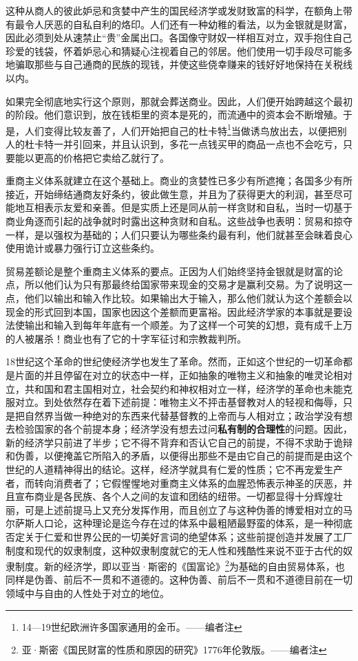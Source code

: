 \documentclass[a4paper,twoside,12pt]{ctexart}
\begin{document}
这种从商人的彼此妒忌和贪婪中产生的国民经济学或发财致富的科学，在额角上带有最令人厌恶的自私自利的烙印。人们还有一种幼稚的看法，以为金银就是财富，因此必须到处从速禁止“贵”金属出口。各国像守财奴一样相互对立，双手抱住自己珍爱的钱袋，怀着妒忌心和猜疑心注视着自己的邻居。他们使用一切手段尽可能多地骗取那些与自己通商的民族的现钱，并使这些侥幸赚来的钱好好地保持在关税线以内。

如果完全彻底地实行这个原则，那就会葬送商业。因此，人们便开始跨越这个最初的阶段。他们意识到，放在钱柜里的资本是死的，而流通中的资本会不断增殖。于是，人们变得比较友善了，人们开始把自己的杜卡特\footnote{14—19世纪欧洲许多国家通用的金币。——编者注 }当做诱鸟放出去，以便把别人的杜卡特一并引回来，并且认识到，多花一点钱买甲的商品一点也不会吃亏，只要能以更高的价格把它卖给乙就行了。

重商主义体系就建立在这个基础上。商业的贪婪性已多少有所遮掩；各国多少有所接近，开始缔结通商友好条约，彼此做生意，并且为了获得更大的利润，甚至尽可能地互相表示友爱和亲善。但是实质上还是同从前一样贪财和自私，当时一切基于商业角逐而引起的战争就时时露出这种贪财和自私。这些战争也表明：贸易和掠夺一样，是以强权为基础的；人们只要认为哪些条约最有利，他们就甚至会昧着良心使用诡计或暴力强行订立这些条约。

贸易差额论是整个重商主义体系的要点。正因为人们始终坚持金银就是财富的论点，所以他们认为只有那最终给国家带来现金的交易才是赢利交易。为了说明这一点，他们以输出和输入作比较。如果输出大于输入，那么他们就认为这个差额会以现金的形式回到本国，国家也因这个差额而更富裕。因此经济学家的本事就是要设法使输出和输入到每年年底有一个顺差。为了这样一个可笑的幻想，竟有成千上万的人被屠杀！商业也有了它的十字军征讨和宗教裁判所。

18世纪这个革命的世纪使经济学也发生了革命。然而，正如这个世纪的一切革命都是片面的并且停留在对立的状态中一样，正如抽象的唯物主义和抽象的唯灵论相对立，共和国和君主国相对立，社会契约和神权相对立一样，经济学的革命也未能克服对立。到处依然存在着下述前提：唯物主义不抨击基督教对人的轻视和侮辱，只是把自然界当做一种绝对的东西来代替基督教的上帝而与人相对立；政治学没有想去检验国家的各个前提本身；经济学没有想去过问\textbf{私有制的合理性}的问题。因此，新的经济学只前进了半步；它不得不背弃和否认它自己的前提，不得不求助于诡辩和伪善，以便掩盖它所陷入的矛盾，以便得出那些不是由它自己的前提而是由这个世纪的人道精神得出的结论。这样，经济学就具有仁爱的性质；它不再宠爱生产者，而转向消费者了；它假惺惺地对重商主义体系的血腥恐怖表示神圣的厌恶，并且宣布商业是各民族、各个人之间的友谊和团结的纽带。一切都显得十分辉煌壮丽，可是上述前提马上又充分发挥作用，而且创立了与这种伪善的博爱相对立的马尔萨斯人口论，这种理论是迄今存在过的体系中最粗陋最野蛮的体系，是一种彻底否定关于仁爱和世界公民的一切美好言词的绝望体系；这些前提创造并发展了工厂制度和现代的奴隶制度，这种奴隶制度就它的无人性和残酷性来说不亚于古代的奴隶制度。新的经济学，即以亚当·斯密的《国富论》\footnote{亚·斯密《国民财富的性质和原因的研究》1776年伦敦版。——编者注}为基础的自由贸易体系，也同样是伪善、前后不一贯和不道德的。这种伪善、前后不一贯和不道德目前在一切领域中与自由的人性处于对立的地位。
\end{document}
